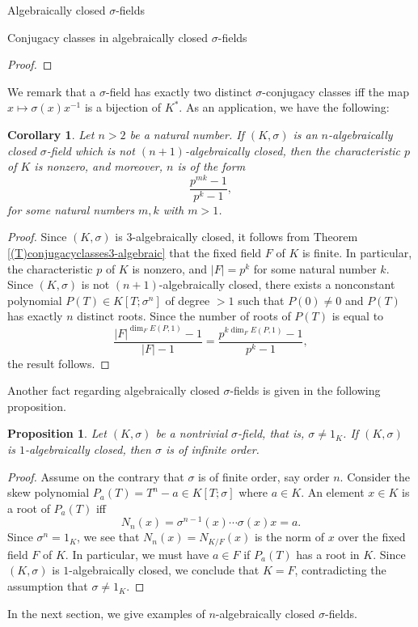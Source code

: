 \documentclass[11pt,a4paper]{article}
\theoremstyle{theorem}
\newtheorem{corollary}[theorem]{Corollary}
\newtheorem{proposition}[theorem]{Proposition}
\numberwithin{equation}{section}
\newcommand{\s}{\sigma}
\begin{document}
\begin{section}{Algebraically closed $\s$-fields}
\begin{subsection}{Conjugacy classes in algebraically closed $\s$-fields}
\begin{proof}
	\end{proof}
	We remark that a $\s$-field has exactly two distinct $\s$-conjugacy classes iff the map $x\mapsto \s(x)x^{-1}$ is a bijection of $K^*$. As an application, we have the following:
	\begin{corollary}
		Let $n>2$ be a natural number. If $(K,\s)$ is an $n$-algebraically closed $\s$-field which is not $(n+1)$-algebraically closed, then the characteristic $p$ of $K$ is nonzero, and moreover, $n$ is of the form
		$$\frac{p^{mk}-1}{p^k-1},$$
		for some natural numbers $m,k$ with $m>1$. 
	\end{corollary}
	\begin{proof}
		Since $(K,\s)$ is $3$-algebraically closed, it follows from  Theorem \ref{(T)conjugacyclasses3-algebraic} that the fixed field $F$ of $K$ is finite. In particular, the characteristic $p$ of $K$ is nonzero, and $|F|=p^k$ for some natural number $k$. Since  $(K,\s)$ is not $(n+1)$-algebraically closed, there exists a nonconstant polynomial $P(T)\in K[T;\s^n]$ of degree $>1$ such that $P(0)\neq 0$ and $P(T)$ has exactly $n$ distinct roots. Since the number of roots of $P(T)$ is equal to 
		$$\frac{|F|^{\dim_F E(P,1)}-1}{|F|-1}=\frac{p^{k\dim_F E(P,1)}-1}{p^k-1},$$
		the result follows.    		
	\end{proof}
	Another fact regarding algebraically closed $\s$-fields is given in the following proposition.
	\begin{proposition}
		Let $(K,\s)$  be a nontrivial $\s$-field, that is, $\s\neq 1_K$. If $(K,\s)$ is $1$-algebraically closed, then $\s$ is of infinite order. 
	\end{proposition}
	\begin{proof}
		Assume on the contrary that $\s$ is of finite order, say order $n$. Consider the skew polynomial $P_a(T)=T^n-a\in K[T;\s]$ where $a\in K$. An element $x\in K$ is a root of $P_a(T)$ iff 
		$$N_n(x)=\s^{n-1}(x)\cdots \s(x)x=a.$$
		Since $\s^n=1_K$, we see that $N_n(x)=N_{K/F}(x)$ is the norm of $x$ over the fixed field $F$ of $K$. In particular, we must have $a\in F$ if $P_a(T)$ has a root in $K$. Since $(K,\s)$ is $1$-algebraically closed, we conclude that $K=F$, contradicting the assumption that $\s\neq 1_K$.    
	\end{proof}		
	In the next section, we give examples of  $n$-algebraically closed $\s$-fields.
	
\end{subsection}


\end{section}
\end{document}
